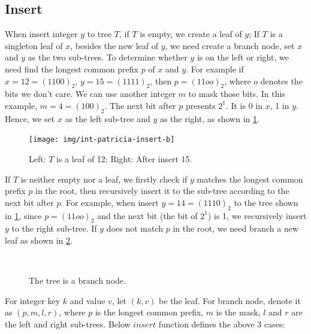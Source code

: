 \documentclass[b5paper]{article}
\begin{document}
\subsection{Insert}
When insert integer $y$ to tree $T$, if $T$ is empty, we create a leaf of $y$; If $T$ is a singleton leaf of $x$, besides the new leaf of $y$, we need create a branch node, set $x$ and $y$ as the two sub-trees. To determine whether $y$ is on the left or right, we need find the longest common prefix $p$ of $x$ and $y$. For example if $x = 12 = (1100)_2$, $y = 15 = (1111)_2$, then $p = (11oo)_2$, where $o$ denotes the bits we don't care. We can use another integer $m$ to mask those bits. In this example, $m = 4 = (100)_2$. The next bit after $p$ presents $2^1$. It is 0 in $x$, 1 in $y$. Hence, we set $x$ as the left sub-tree and $y$ as the right, as shown in \cref{fig:int-patricia-insert-b}.

\begin{figure}[htbp]
  \centering
  \texttt{[image: img/int-patricia-insert-b]}
  \caption{Left: $T$ is a leaf of 12; Right: After insert 15.}
  \label{fig:int-patricia-insert-b}
\end{figure}

If $T$ is neither empty nor a leaf, we firstly check if $y$ matches the longest common prefix $p$ in the root, then recursively insert it to the sub-tree according to the next bit after $p$. For example, when insert $y = 14 = (1110)_2$ to the tree shown in \cref{fig:int-patricia-insert-b}, since $p = (11oo)_2$ and the next bit (the bit of $2^1$) is 1, we recursively insert $y$ to the right sub-tree. If $y$ does not match $p$ in the root, we need branch a new leaf as shown in \cref{fig:int-patricia-insert-c}.

\begin{figure}[htbp]
  \centering
  \\
  \caption{The tree is a branch node.}
  \label{fig:int-patricia-insert-c}
\end{figure}

For integer key $k$ and value $v$, let $(k, v)$ be the leaf. For branch node, denote it as $(p, m, l, r)$, where $p$ is the longest common prefix, $m$ is the mask, $l$ and $r$ are the left and right sub-trees. Below $insert$ function defines the above 3 cases:
\end{document}
